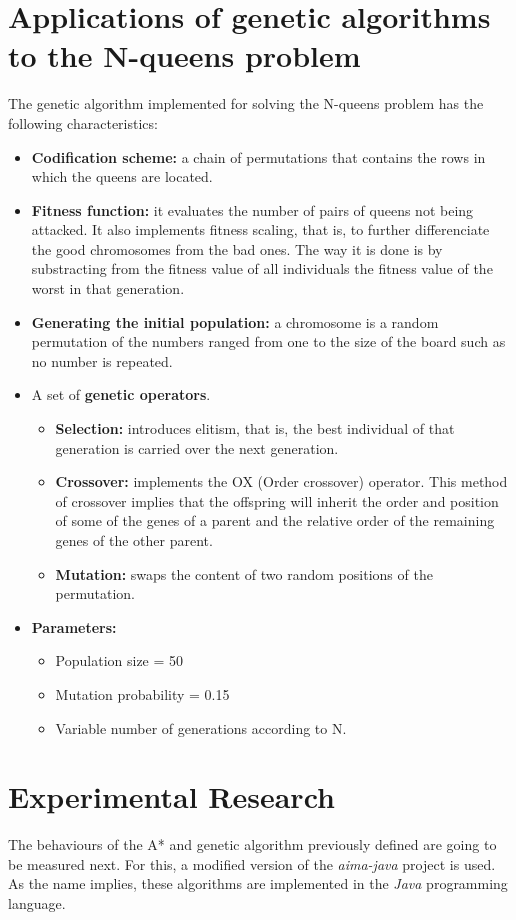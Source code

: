 \documentclass[]{llncs}
\begin{document}
\section{Applications of genetic algorithms to the N-queens problem}\label{gen_nqueens}
The genetic algorithm implemented for solving the N-queens problem has the following characteristics:
\begin{itemize}
    \item \textbf{Codification scheme:} a chain of permutations that contains the rows in which the queens are located.
    \item \textbf{Fitness function:} it evaluates the number of pairs of queens not being attacked. It also implements fitness scaling, that is, to further differenciate the good chromosomes from the bad ones. The way it is done is by substracting from the fitness value of all individuals the fitness value of the worst in that generation. 
    \item \textbf{Generating the initial population:} a chromosome is a random permutation of the numbers ranged from one to the size of the board such as no number is repeated.
    \item A set of \textbf{genetic operators}. 
        \begin{itemize}
            \item \textbf{Selection:} introduces elitism, that is, the best individual of that generation is carried over the next generation.
            \item \textbf{Crossover:} implements the OX (Order crossover) operator. This method of crossover implies that the offspring will inherit the order and position of some of the genes of a parent and the relative order of the remaining genes of the other parent.
            \item \textbf{Mutation:} swaps the content of two random positions of the permutation.
        \end{itemize}
    \item \textbf{Parameters:}
        \begin{itemize}
            \item Population size = 50
            \item Mutation probability = 0.15
            \item Variable number of generations according to N.
        \end{itemize}
\end{itemize}
\section{Experimental Research}\label{exp_research}
The behaviours of the A* and genetic algorithm previously defined are going to be measured next. For this, a modified version of the \textit{aima-java} project \cite{aimajava} is used. As the name implies, these algorithms are implemented in the \textit{Java} programming language.
\end{document}
